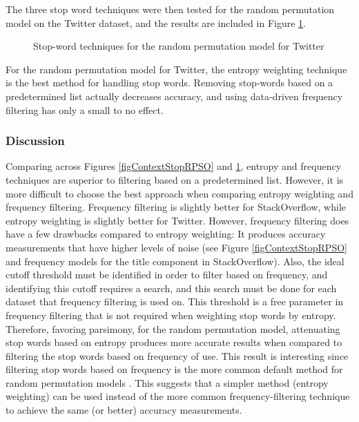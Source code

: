\documentclass[man,floatsintext,donotrepeattitle]{apa6}
\begin{document}
The three stop word techniques were then tested for the random permutation model on the Twitter dataset, and the results are included in Figure \ref{figContextStopRPT}.

\begin{figure}[!htbp]
  \caption{Stop-word techniques for the random permutation model for Twitter}
  \label{figContextStopRPT}
\end{figure}

For the random permutation model for Twitter, the entropy weighting technique is the best method for handling stop words.
Removing stop-words based on a predetermined list actually decreases accuracy, and using data-driven frequency filtering has only a small to no effect.

\subsubsection{Discussion}

Comparing across Figures \ref{figContextStopRPSO} and \ref{figContextStopRPT}, entropy and frequency techniques are superior to filtering based on a predetermined list.
However, it is more difficult to choose the best approach when comparing entropy weighting and frequency filtering.
Frequency filtering is slightly better for StackOverflow, while entropy weighting is slightly better for Twitter.
However, frequency filtering does have a few drawbacks compared to entropy weighting:
It produces accuracy measurements that have higher levels of noise (see Figure \ref{figContextStopRPSO} and frequency models for the title component in StackOverflow).
Also, the ideal cutoff threshold must be identified in order to filter based on frequency,
and identifying this cutoff requires a search, and this search must be done for each dataset that frequency filtering is used on.
This threshold is a free parameter in frequency filtering that is not required when weighting stop words by entropy.
Therefore, favoring parsimony, for the random permutation model, attenuating stop words based on entropy produces more accurate results when compared to filtering the stop words based on frequency of use.
This result is interesting since filtering stop words based on frequency is the more common default method for random permutation models \parencite{Sahlgren2008}.
This suggests that a simpler method (entropy weighting) can be used instead of the more common frequency-filtering technique to achieve the same (or better) accuracy measurements.
\end{document}
